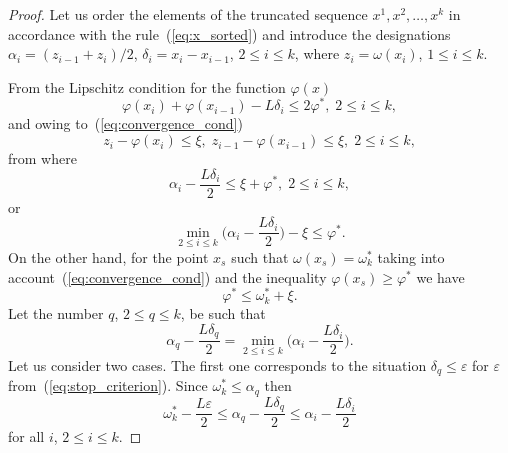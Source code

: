 \documentclass[preprint]{elsarticle}
\begin{document}
\begin{proof}
  Let us order the elements of the truncated sequence $x^1, x^2, \dots, x^k$ in accordance with the rule~(\ref{eq:x_sorted}) and introduce the designations $\alpha_i = (z_{i - 1} + z_i) / 2$, $\delta_i = x_i - x_{i - 1}$, $2 \leq i \leq k$, where $z_i = \omega(x_i)$, $1 \leq i \leq k$.

  From the Lipschitz condition for the function $\varphi(x)$
  \begin{equation}
    \varphi(x_i) + \varphi(x_{i - 1}) - L\delta_i \leq 2\varphi^*, \; 2 \leq i \leq k,
  \end{equation}
  and owing to~(\ref{eq:convergence_cond})
  \begin{equation}
    z_i - \varphi(x_i) \leq \xi, \; z_{i - 1} - \varphi(x_{i - 1}) \leq \xi, \; 2 \leq i \leq k,
  \end{equation}
  from where
  \begin{equation}
    \alpha_i - \frac{L \delta_i}{2} \leq \xi + \varphi^*, \; 2 \leq i \leq k,
  \end{equation}
  or
  \begin{equation}
    \label{eq:min_alpha_L_delta}
    \min_{2 \leq i \leq k} \Big( \alpha_i - \frac{L \delta_i}{2} \Big) - \xi \leq \varphi^*.
  \end{equation}
  On the other hand, for the point $x_s$ such that $\omega(x_s) = \omega_k^*$ taking into account~(\ref{eq:convergence_cond}) and the inequality $\varphi(x_s) \geq \varphi^*$ we have
  \begin{equation}
    \label{eq:phi_leq_omega_xi}
    \varphi^* \leq \omega_k^* + \xi.
  \end{equation}
  Let the number $q$, $2 \leq q \leq k$, be such that
  \begin{equation}
    \alpha_q - \frac{L \delta_q}{2} = \min_{2 \leq i \leq k} \Big( \alpha_i - \frac{L \delta_i}{2} \Big).
  \end{equation}
  Let us consider two cases.
  The first one corresponds to the situation $\delta_q \leq \varepsilon$ for $\varepsilon$ from~(\ref{eq:stop_criterion}). Since $\omega_k^* \leq \alpha_q$ then
  \begin{equation}
    \omega_k^* - \frac{L \varepsilon}{2} \leq \alpha_q - \frac{L \delta_q}{2} \leq \alpha_i - \frac{L \delta_i}{2}
  \end{equation}
  for all $i$, $2 \leq i \leq k$.


\end{proof}
\end{document}
